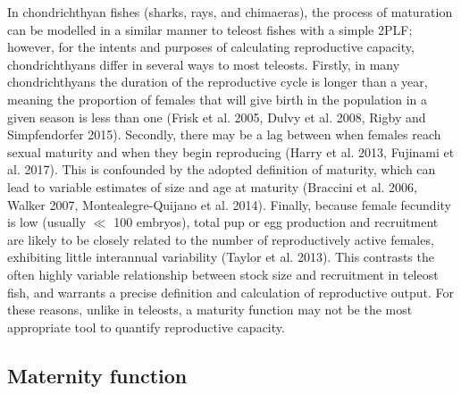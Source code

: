 \documentclass[
]{article}
\begin{document}
In chondrichthyan fishes (sharks, rays, and chimaeras), the process of maturation can be modelled in a similar manner to teleost fishes with a simple 2PLF; however, for the intents and purposes of calculating reproductive capacity, chondrichthyans differ in several ways to most teleosts. Firstly, in many chondrichthyans the duration of the reproductive cycle is longer than a year, meaning the proportion of females that will give birth in the population in a given season is less than one (Frisk et al. 2005, Dulvy et al. 2008, Rigby and Simpfendorfer 2015). Secondly, there may be a lag between when females reach sexual maturity and when they begin reproducing (Harry et al. 2013, Fujinami et al. 2017). This is confounded by the adopted definition of maturity, which can lead to variable estimates of size and age at maturity (Braccini et al. 2006, Walker 2007, Montealegre-Quijano et al. 2014). Finally, because female fecundity is low (usually \(\ll\) 100 embryos), total pup or egg production and recruitment are likely to be closely related to the number of reproductively active females, exhibiting little interannual variability (Taylor et al. 2013). This contrasts the often highly variable relationship between stock size and recruitment in teleost fish, and warrants a precise definition and calculation of reproductive output. For these reasons, unlike in teleosts, a maturity function may not be the most appropriate tool to quantify reproductive capacity.

\subsection{Maternity function}\label{maternity-function}
\end{document}
